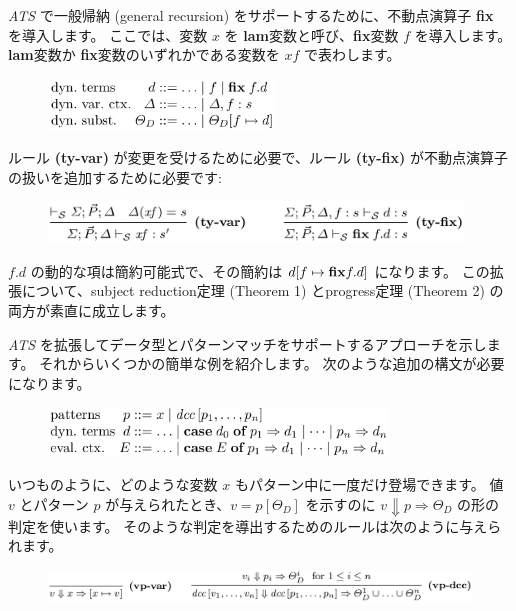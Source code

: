 \documentclass[submit,techreq,noauthor,onecolumn]{ipsj}
\begin{document}
{\it ATS} で一般帰納 (general recursion) をサポートするために、不動点演算子 {\bf fix} を導入します。
ここでは、変数 $x$ を {\bf lam}変数と呼び、{\bf fix}変数 $f$ を導入します。
 {\bf lam}変数か {\bf fix}変数のいずれかである変数を $xf$ で表わします。

\begin{figure}[h]
\centering
\includegraphics[width=6cm]{img/infig3_general_recursion.png}
\end{figure}

ルール {\bf (ty-var)} が変更を受けるために必要で、ルール {\bf (ty-fix)} が不動点演算子の扱いを追加するために必要です:

\begin{figure}[h]
\centering
\includegraphics[width=11cm]{img/infig3_fixed-point_op.png}
\end{figure}

 $f.d$ の動的な項は簡約可能式で、その簡約は $d[f \mapsto {\bf fix} f.d]$ になります。
この拡張について、subject reduction定理 (Theorem 1) とprogress定理 (Theorem 2) の両方が素直に成立します。

{\it ATS} を拡張してデータ型とパターンマッチをサポートするアプローチを示します。
それからいくつかの簡単な例を紹介します。
次のような追加の構文が必要になります。

\begin{figure}[h]
\centering
\includegraphics[width=9cm]{img/infig3_pattern_match.png}
\end{figure}

\noindent いつものように、どのような変数 $x$ もパターン中に一度だけ登場できます。
値 $v$ とパターン $p$ が与えられたとき、$v = p[\Theta_D]$ を示すのに $v \Downarrow p \Rightarrow \Theta_D$ の形の判定を使います。
そのような判定を導出するためのルールは次のように与えられます。

\begin{figure}[h]
\centering
\includegraphics[width=14cm]{img/infig3_vp-doc.png}
\end{figure}
\end{document}
